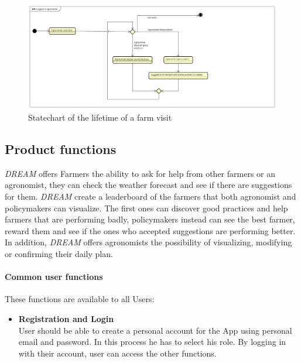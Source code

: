 \bigskip
\begin{figure}[H]
    \includegraphics[width=\textwidth,height=\textheight,keepaspectratio]{Images/agronomistVisitFarm.png}
    \caption{Statechart of the lifetime of a farm visit}
    \label{fig:statechart_agronomist_visit}
\end{figure}

\newpage
\subsection{Product functions}
\emph{DREAM} offers Farmers the ability to ask for help from other farmers or an agronomist, 
they can check the weather forecast and see if there are suggestions for them. 
\emph{DREAM} create a leaderboard of the farmers that both agronomist and policymakers can visualize. 
The first ones can discover good practices and help farmers that are performing badly, 
policymakers instead can see the best farmer, reward them and see if the ones who accepted 
suggestions are performing better. 
In addition, \emph{DREAM} offers agronomists the possibility of visualizing, modifying or confirming their daily plan.

\paragraph{Common user functions} These functions are available to all Users:
\begin{itemize}
    \item \textbf{Registration and Login}\\
          User should be able to create a personal account for the App using personal email and password.
          In this process he has to select his role.
          \newline By logging in with their account, user can access the other functions.
\end{itemize}

